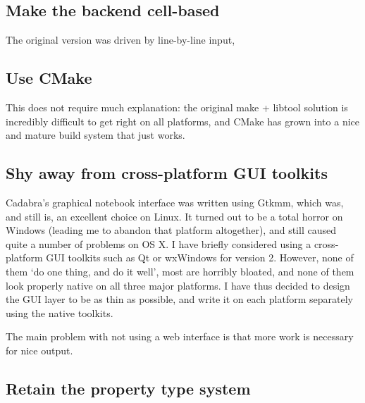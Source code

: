 \documentclass[11pt]{article}
\begin{document}
\subsection{Make the backend cell-based}

The original version was driven by line-by-line input, 


\subsection{Use CMake}

This does not require much explanation: the original make + libtool
solution is incredibly difficult to get right on all platforms, and
CMake has grown into a nice and mature build system that just works.

\subsection{Shy away from cross-platform GUI toolkits}

Cadabra's graphical notebook interface was written using Gtkmm, which
was, and still is, an excellent choice on Linux. It turned out to be a
total horror on Windows (leading me to abandon that platform
altogether), and still caused quite a number of problems on OS X.  I
have briefly considered using a cross-platform GUI toolkits such as Qt
or wxWindows for version 2. However, none of them `do one thing, and
do it well', most are horribly bloated, and none of them look properly
native on all three major platforms. I have thus decided to design the
GUI layer to be as thin as possible, and write it on each platform
separately using the native toolkits.

The main problem with not using a web interface is that more work is
necessary for nice output. 

\subsection{Retain the property type system}
\end{document}
